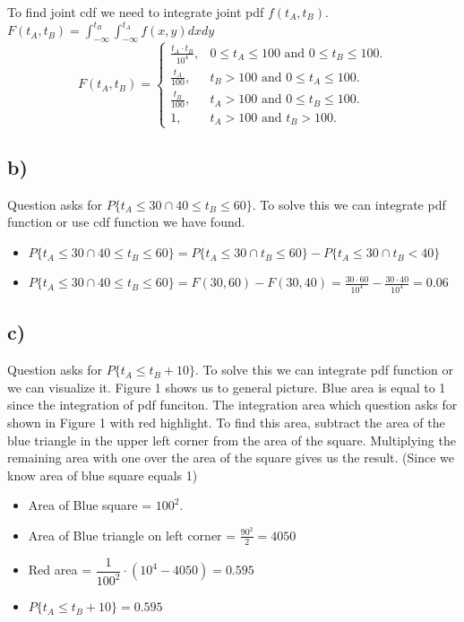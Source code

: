\documentclass[12pt]{article}
\begin{document}
To find joint cdf we need to integrate joint pdf $f(t_A, t_B)$. $F(t_A, t_B) = \int_{-\infty}^{t_B} \int_{-\infty}^{t_A}f(x,y)dxdy$
\begin{equation*}
      F(t_A,t_B)=\left\{
        \begin{array}{ll}
          \frac{t_A \cdot t_B}{10^4}, & \mbox{$0 \leq t_A \leq 100$ and $0 \leq t_B \leq 100$}.\\
          \frac{t_A}{100}, & \mbox{$t_B > 100$ and $0 \leq t_A \leq 100$}. \\ 
          \frac{t_B}{100}, & \mbox{$t_A > 100$ and $0 \leq t_B \leq 100$}. \\
          1, & \mbox{$t_A > 100$ and $t_B > 100$}.
        \end{array}
      \right.
\end{equation*}

\subsection*{b)} 
Question asks for $P\{t_A \leq 30 \cap 40 \leq t_B \leq 60\}$. To solve this we can integrate pdf function or use cdf function we have found.
\begin{itemize}
    \item $P\{t_A \leq 30 \cap 40 \leq t_B \leq 60\} = P\{t_A \leq 30 \cap t_B \leq 60\} - P\{t_A \leq 30 \cap  t_B < 40\}$
    \item $P\{t_A \leq 30 \cap 40 \leq t_B \leq 60\} = F(30,60) - F(30,40) = \frac{30 \cdot 60}{10^4} - \frac{30 \cdot 40}{10^4} = 0.06$
\end{itemize}

\subsection*{c)}
Question asks for $P\{t_A \leq t_B + 10\}$. To solve this we can integrate pdf function or we can visualize it. Figure 1 shows us to general picture. Blue area is equal to 1 since the integration of pdf funciton. The integration area which question asks for shown in Figure 1 with red highlight. To find this area, subtract the area of the blue triangle in the upper left corner from the area of the square. Multiplying the remaining area with one over the area of the square gives us the result. (Since we know area of blue square equals 1)
\begin{itemize}
    \item Area of Blue square = $100^2$.
    \item Area of Blue triangle on left corner = $\frac{90^2}{2}=4050$
    \item Red area = $\dfrac{1}{100^2} \cdot (10^4-4050 )= 0.595$
    \item $P\{t_A \leq t_B + 10\} = 0.595$
    
\end{itemize}
\end{document}
